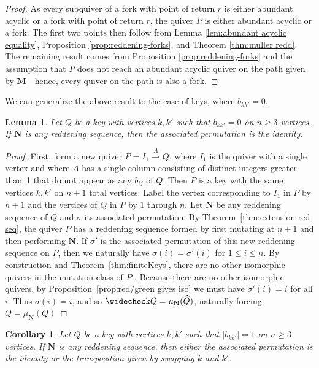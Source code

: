 \documentclass[11pt, letterpaper]{amsart}
\newtheorem{corollary}[theorem]{Corollary}
\newtheorem{lemma}[theorem]{Lemma}
\theoremstyle{definition}
\numberwithin{equation}{section}
\begin{document}
\begin{proof}
    As every subquiver of a fork with point of return $r$ is either abundant acyclic or a fork with point of return $r$, the quiver $P$ is either abundant acyclic or a fork.
    The first two points then follow from Lemma \ref{lem:abundant acyclic equality}, Proposition \ref{prop:reddening-forks}, and Theorem \ref{thm:muller redd}.
    The remaining result comes from Proposition \ref{prop:reddening-forks} and the assumption that $P$ does not reach an abundant acyclic quiver on the path given by $\mathbf{M}$---hence, every quiver on the path is also a fork.
\end{proof}


We can generalize the above result to the case of keys, where $b_{kk'} = 0$.

\begin{lemma} \label{lem:reddening sequences keys 0}
Let $Q$ be a key with vertices $k,k'$ such that $b_{kk'} = 0$ on $n \geq 3$ vertices.
If $\mathbf{N}$ is any reddening sequence, then the associated permutation is the identity.
\end{lemma}

\begin{proof}
    First, form a new quiver $P = I_1 \stackrel{A}{\rightarrow} Q$, where $I_1$ is the quiver with a single vertex and where $A$ has a single column consisting of distinct integers greater than~1 that do not appear as any $b_{ij}$ of $Q$.
    Then $P$ is a key with the same vertices $k, k'$ on $n+1$ total vertices.
    Label the vertex corresponding to $I_1$ in $P$ by $n+1$ and the vertices of $Q$ in $P$ by $1$ through $n$.
    Let $\mathbf{N}$ be any reddening sequence of $Q$ and $\sigma$ its associated permutation.
    By Theorem~\ref{thm:extension red seq}, the quiver $P$ has a reddening sequence formed by first mutating at $n+1$ and then performing $\mathbf{N}$.
    If $\sigma'$ is the associated permutation of this new reddening sequence on $P$, then we naturally have $\sigma(i) = \sigma'(i)$ for $1 \leq i \leq n$.
    By construction and Theorem~\ref{thm:finiteKeys}, there are no other isomorphic quivers in the mutation class of $P$ \cite{MR4695532}.
    Because there are no other isomorphic quivers, by Proposition~\ref{prop:red/green gives iso} we must have $\sigma'(i)=i$ for all $i$.
    Thus $\sigma(i)=i$, and so $\widecheck Q = \mu_\mathbf{N}(\widehat Q)$, naturally forcing $Q = \mu_\mathbf{N}(Q)$
\end{proof}

\begin{corollary}\label{cor:reddening sequences keys 1}
Let $Q$ be a key with vertices $k,k'$ such that $|b_{kk'}| = 1$ on $n \geq 3$ vertices.
If $\mathbf{N}$ is any reddening sequence, then either the associated permutation is the identity or the transposition given by swapping $k$ and $k'$.
\end{corollary} 
\end{document}
